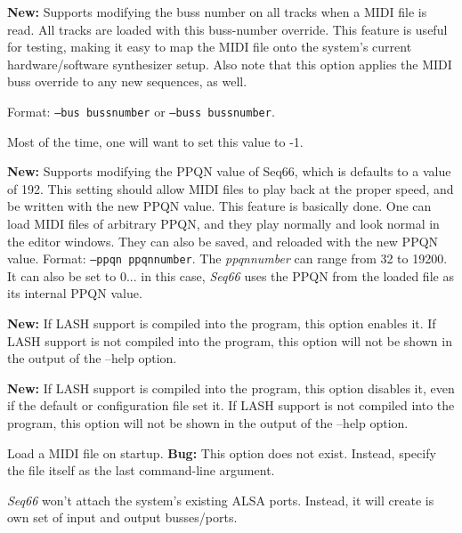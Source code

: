      \textbf{New:}
      Supports modifying the buss number on all tracks when a MIDI file is
      read.  All tracks are loaded with this buss-number override.  This
      feature is useful for testing, making it easy to map the MIDI file onto
      the system's current hardware/software synthesizer setup.
      Also note that this option applies the MIDI buss override to any new
      sequences, as well.

      Format: \texttt{--bus bussnumber} or
      \texttt{--buss bussnumber}.

      Most of the time, one will want to set this value to -1.

      \textbf{New:}
      Supports modifying the PPQN value of Seq66, which is
      defaults to a value of 192.  This setting should allow MIDI files to
      play back at the proper speed, and be written with the new PPQN value.
      This feature is basically done.
      One can load MIDI files of arbitrary PPQN, and they
      play normally and look normal in the editor windows.  They can also be
      saved, and reloaded with the new PPQN value. 
      Format: \texttt{--ppqn ppqnnumber}.
      The \textsl{ppqnnumber} can range from 32 to 19200.
      It can also be set to 0... in this case, \textsl{Seq66}
      uses the PPQN from the loaded file as its internal PPQN value.

      \textbf{New:}
      If LASH support is compiled into the program, this option
      enables it.
      If LASH support is not compiled into the program, this option will not
      be shown in the output of the --help option.

      \textbf{New:}
      If LASH support is compiled into the program, this option
      disables it, even if the default or configuration file set it.
      If LASH support is not compiled into the program, this option will not
      be shown in the output of the --help option.

      Load a MIDI file on startup.
      \textbf{Bug:}
      This option does not exist.
      Instead, specify the file itself as the last command-line argument.

      \textsl{Seq66} won't attach the system's existing ALSA ports.
      Instead, it will create is own set of input and output busses/ports.

